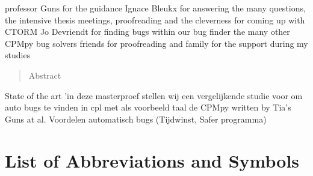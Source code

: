 \documentclass[master=cws,masteroption=se,english]{kulemt} %
\begin{document}
\begin{preface}
  professor Guns for the guidance %
  Ignace Bleukx for answering the many questions, the intensive thesis meetings, proofreading and the cleverness for coming up with CTORM
  Jo Devriendt for finding bugs within our bug finder
  the many other CPMpy bug solvers
  friends for proofreading 
  and family for the support during my studies 
  
\end{preface}

\listoftodos
\tableofcontents*
\setcounter{tocdepth}{5} %

\begin{abstract}
  Abstract 
\end{abstract}

\begin{abstract*}

State of the art 
'in deze masterproef stellen wij een vergelijkende studie voor om auto bugs te vinden in cpl met als voorbeeld taal de CPMpy written by Tia's Guns at al.
Voordelen automatisch bugs (Tijdwinst, Safer programma)


\end{abstract*}

\listoffiguresandtables
\lstlistoflistings
\chapter{List of Abbreviations and Symbols}
\end{document}
